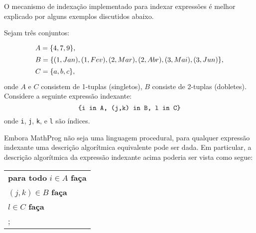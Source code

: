 \documentclass[11pt, brazil]{report}
\begin{document}
\vspace*{-8pt}

O mecanismo de indexação implementado para indexar expressões é melhor
explicado por alguns exemplos discutidos abaixo.

Sejam três conjuntos:
%
$$
{\def\arraystretch{1.4}
\begin{array}{l}
A=\{4,7,9\},\\
B=\{(1,Jan),(1,Fev),(2,Mar),(2,Abr),(3,Mai),(3,Jun)\},\\
C=\{a,b,c\},\\
\end{array}
}
$$
onde $A$ e $C$ consistem de 1-tuplas (singletos), $B$ consiste de
2-tuplas (dobletes). Considere a seguinte expressão indexante:
$$\mbox{{\tt\{i in A, (j,k) in B, l in C\}}}$$
onde {\tt i}, {\tt j}, {\tt k}, e {\tt l} são índices.


\newpage

Embora MathProg não seja uma linguagem procedural, para qualquer
expressão indexante uma descrição algorítmica equivalente pode ser dada.
Em particular, a descrição algorítmica da expressão indexante acima
poderia ser vista como segue:


\noindent\hfil
\begin{tabular}{@{}l@{}}
{\bf para todo} $i\in A$ {\bf faça}\\
\hspace{16pt}{\bf para todo} $(j,k)\in B$ {\bf faça}\\
\hspace{32pt}{\bf para todo} $l\in C$ {\bf faça}\\
\hspace{48pt}{\it ação};\\
\end{tabular}
\end{document}

